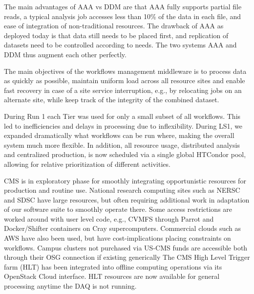 \documentclass[11pt,a4paper]{article}
\begin{document}
The main advantages of AAA vs DDM are that AAA fully supports partial file reads,
a typical analysis job accesses less than 10\% of the data in each file, and ease of integration
of non-traditional resources. The drawback of AAA as deployed today is that data still needs to be placed first,
and replication of datasets need to be controlled according to needs. 
The two systems AAA and DDM thus augment each other perfectly.


The main objectives of the workflows management middleware is to
process data as quickly as possible, maintain uniform load across all
resource sites and enable fast recovery in case of a site service
interruption, e.g., by relocating jobs on an alternate site, while
keep track of the integrity of the combined dataset.  

During Run 1 each Tier was used for only a small subset of all workflows.
This led to inefficiencies and delays in processing due to inflexibility.
During LS1, we expanded dramatically what workflows can be run where, making the overall system
much more flexible. In addition, all resource usage, distributed analysis and centralized production,
is now scheduled via a single global HTCondor pool, allowing for relative prioritization of different
activities.


CMS is in exploratory phase for smoothly integrating opportunistic
resources for production and routine use. National research computing
sites such as NERSC and SDSC have large resources, but often requiring
additional work in adaptation of our software suite to smoothly
operate there. Some access restrictions are worked around with user
level code, e.g., CVMFS through Parrot and Docker/Shifter containers
on Cray supercomputers. Commercial clouds such as AWS have also been
used, but have cost-implications placing constraints on workflows.  
Campus clusters not purchased via US-CMS funds are accessible both
through their OSG connection if existing generically
The CMS High Level Trigger farm (HLT) has been integrated into offline computing operations
via its OpenStack Cloud interface. HLT resources are now available for general processing anytime the
DAQ is not running.
\end{document}
